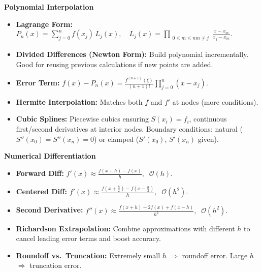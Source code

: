 \documentclass[9pt,letterpaper]{article}
\begin{document}
\begin{multicols*}{3}
  \noindent
  \textbf{\large Polynomial Interpolation}
  \begin{itemize}
    \item \textbf{Lagrange Form:} 
      $ 
      P_n(x) = \sum_{j=0}^n f(x_j)\,L_j(x), 
      \quad 
      L_j(x) = \prod_{\substack{0\le m \le n m\neq j}} \frac{x - x_m}{x_j - x_m}.
      $ 
    \item \textbf{Divided Differences (Newton Form):} Build polynomial incrementally. Good for reusing previous calculations if new points are added.
    \item \textbf{Error Term:} 
      $f(x)-P_n(x) = \frac{f^{(n+1)}(\xi)}{(n+1)!}\prod_{j=0}^n (x-x_j).$
    \item \textbf{Hermite Interpolation:} Matches both $f$ and $f'$ at nodes (more conditions).
    \item \textbf{Cubic Splines:} Piecewise cubics ensuring $S(x_i)=f_i$, continuous first/second derivatives at interior nodes. Boundary conditions: natural ($S''(x_0)=S''(x_n)=0$) or clamped ($S'(x_0)$, $S'(x_n)$ given).
  \end{itemize}

  \noindent
  \textbf{\large Numerical Differentiation}
  \begin{itemize}
    \item \textbf{Forward Diff:} 
      $
      f'(x)\approx \frac{f(x+h) - f(x)}{h}, 
      \;\; \mathcal{O}(h).
      $
    \item \textbf{Centered Diff:} 
      $
      f'(x)\approx \frac{f(x+\tfrac{h}{2}) - f(x-\tfrac{h}{2})}{h}, 
      \;\; \mathcal{O}(h^2).
      $
    \item \textbf{Second Derivative:} 
      $
      f''(x)\approx \frac{f(x+h)-2f(x)+f(x-h)}{h^2}, 
      \;\; \mathcal{O}(h^2).
      $
    \item \textbf{Richardson Extrapolation:} Combine approximations with different $h$ to cancel leading error terms and boost accuracy.
    \item \textbf{Roundoff vs.\ Truncation:} Extremely small $h$ $\Rightarrow$ roundoff error. Large $h$ $\Rightarrow$ truncation error.
  \end{itemize}


\end{multicols*}
\end{document}
